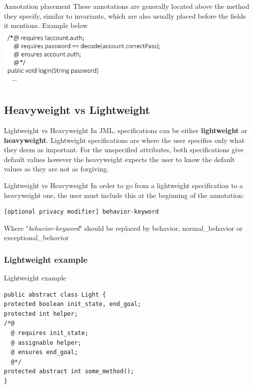 \documentclass{beamer}
\begin{document}
\begin{frame}{Annotation placement}
    These annotations are generally located above the method they specify, similar to invariants, which are also usually placed before the fields it mentions. Example below\\
    \bigskip
    \centering\includegraphics[width=8.5cm,height=3cm]{pic/jmllogin.png}
\end{frame}

\subsection{Heavyweight vs Lightweight}
\begin{frame}{Lightweight vs Heavyweight}
    In JML, specifications can be either \textbf{lightweight} or \textbf{heavyweight}. Lightweight specifications are where the user specifies only what they deem as important. For the unspecified attributes, both specifications give default values however the heavyweight expects the user to know the default values as they are not as forgiving.
\end{frame}

\begin{frame}[fragile]{Lightweight vs Heavyweight}
     In order to go from a lightweight specification to a heavyweight one, the user must include this at the beginning of the annotation:
    \begin{lstlisting}
[optional privacy modifier] behavior-keyword
    \end{lstlisting}
    Where "\textit{behavior-keyword}" should be replaced by behavior, normal\_behavior or exceptional\_behavior
\end{frame}

\subsubsection{Lightweight example}
\begin{frame}[fragile]{Lightweight example}
    \begin{lstlisting}
public abstract class Light {
protected boolean init_state, end_goal;
protected int helper;
/*@
  @ requires init_state;
  @ assignable helper;
  @ ensures end_goal;
  @*/
protected abstract int some_method();
}        
    \end{lstlisting}
   
\end{frame}
\end{document}
